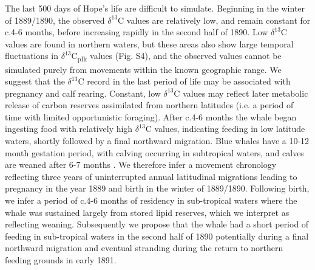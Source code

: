 \documentclass[a4paper,12pt]{article}
\begin{document}
The last 500 days of Hope's life are difficult to simulate.
Beginning in the winter of 1889/1890, the observed \(\delta^{13}\)C values are relatively low, and remain constant for c.4-6 months, before increasing rapidly in the second half of 1890. 
Low \(\delta^{13}\)C values are found in northern waters, but these areas also show large temporal fluctuations in \(\delta^{13}\)C\textsubscript{plk} values (Fig. S4), and the observed values cannot be simulated purely from movements within the known geographic range. 
We suggest that the \(\delta^{13}\)C record in the last period of life may be associated with pregnancy and calf rearing. 
Constant, low \(\delta^{13}\)C values may reflect later metabolic release of carbon reserves assimilated from northern latitudes (i.e. a period of time with limited opportunistic foraging). 
After c.4-6 months the whale began ingesting food with relatively high \(\delta^{13}\)C values, indicating feeding in low latitude waters, shortly followed by a final northward migration. Blue whales have a 10-12 month gestation period, with calving occurring in subtropical waters, and calves are weaned after 6-7 months \cite{handbook}.
We therefore infer a movement chronology reflecting three years of uninterrupted annual latitudinal migrations leading to pregnancy in the
year 1889 and birth in the winter of 1889/1890. 
Following birth, we infer a period of c.4-6 months of residency in sub-tropical waters where the whale was sustained largely from stored lipid reserves, which we interpret as reflecting weaning. 
Subsequently we propose that the whale had a short period of feeding in sub-tropical waters in the second half of 1890 potentially during a final northward migration and eventual stranding during the return to northern feeding grounds in early 1891.
\end{document}
